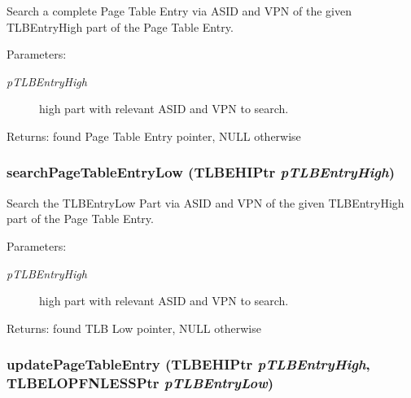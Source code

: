 Search a complete Page Table Entry via ASID and VPN of the given TLBEntryHigh part of the Page Table Entry. \begin{Desc}
\item[Parameters:]
\begin{description}
\item[{\em pTLBEntryHigh}]high part with relevant ASID and VPN to search. \end{description}
\end{Desc}
\begin{Desc}
\item[Returns:]found Page Table Entry pointer, NULL otherwise \end{Desc}
\hypertarget{group___v_m_m___p_t_g0021597aea50ac13519f811f316c4fd7}{
\subsubsection[{searchPageTableEntryLow}]{ searchPageTableEntryLow ({\bf TLBEHIPtr} {\em pTLBEntryHigh})}}
\label{group___v_m_m___p_t_g0021597aea50ac13519f811f316c4fd7}


Search the TLBEntryLow Part via ASID and VPN of the given TLBEntryHigh part of the Page Table Entry. \begin{Desc}
\item[Parameters:]
\begin{description}
\item[{\em pTLBEntryHigh}]high part with relevant ASID and VPN to search. \end{description}
\end{Desc}
\begin{Desc}
\item[Returns:]found TLB Low pointer, NULL otherwise \end{Desc}
\hypertarget{group___v_m_m___p_t_g621765a4679ecc5e2d8e1257ba21d440}{
\subsubsection[{updatePageTableEntry}]{ updatePageTableEntry ({\bf TLBEHIPtr} {\em pTLBEntryHigh}, \/  {\bf TLBELOPFNLESSPtr} {\em pTLBEntryLow})}}
\label{group___v_m_m___p_t_g621765a4679ecc5e2d8e1257ba21d440}


